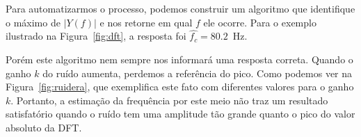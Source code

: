 \documentclass{homeworkclass}
\begin{document}
\begin{homeworkProblem}
	Para automatizarmos o processo, podemos construir um algoritmo que identifique o máximo de $|Y(f)|$ e nos retorne em qual $f$ ele ocorre. Para o exemplo ilustrado na Figura~\ref{fig:dft}, a resposta foi $\hat{f_c} = 80.2$~Hz.
	
	Porém este algoritmo nem sempre nos informará uma resposta correta. Quando o ganho $k$ do ruído aumenta, perdemos a referência do pico. Como podemos ver na Figura~\ref{fig:ruidera}, que exemplifica este fato com diferentes valores para o ganho $k$. Portanto, a estimação da frequência por este meio não traz um resultado satisfatório quando o ruído tem uma amplitude tão grande quanto o pico do valor absoluto da DFT.
	
	\begin{figure}[!h]
		\centering
		~
		\\
		~
		

\end{figure}
\end{homeworkProblem}
\end{document}
